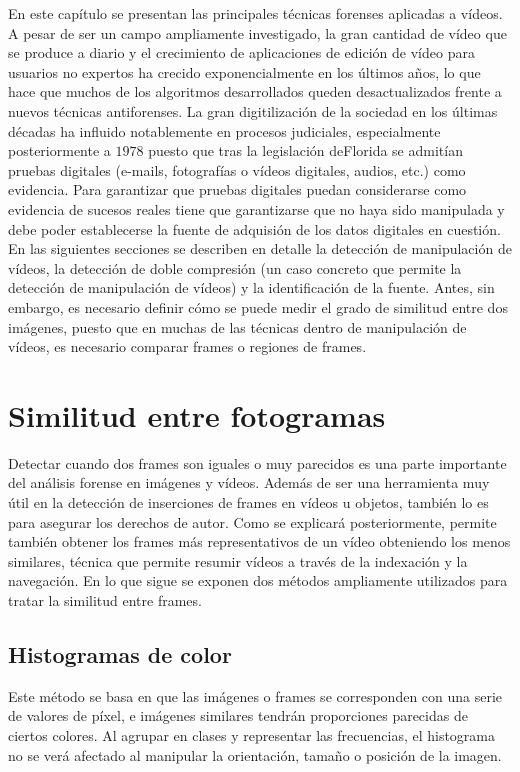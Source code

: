 En este capítulo se presentan las principales técnicas forenses aplicadas a vídeos. A pesar de ser un campo ampliamente investigado, la gran cantidad de vídeo que se produce a diario y el crecimiento de aplicaciones de edición de vídeo para usuarios no expertos ha crecido exponencialmente en los últimos a\~nos, lo que hace que muchos de los algoritmos desarrollados queden desactualizados frente a nuevos técnicas antiforenses. 
La gran digitilización de la sociedad en los últimas décadas ha influido notablemente en procesos judiciales, especialmente posteriormente a $1978$ puesto que tras la legislación deFlorida se admitían pruebas digitales (e-mails, fotografías o vídeos digitales, audios, etc.) como evidencia. Para garantizar que pruebas digitales puedan considerarse como evidencia de sucesos reales tiene que garantizarse que no haya sido manipulada y debe poder establecerse la fuente de adquisión de los datos digitales en cuestión. \\

En las siguientes secciones se describen en detalle la detección de manipulación de vídeos, la detección de doble compresión (un caso concreto que permite la detección de manipulación de vídeos) y la identificación de la fuente. Antes, sin embargo, es necesario definir cómo se puede medir el grado de similitud entre dos imágenes, puesto que en muchas de las técnicas dentro de manipulación de vídeos, es necesario comparar frames o regiones de frames. \\

\section{Similitud entre fotogramas}
Detectar cuando dos frames son iguales o muy parecidos es una parte importante del análisis forense en imágenes y vídeos. Además de ser una herramienta muy útil en la detección de inserciones de frames en vídeos u objetos, también lo es para asegurar los derechos de autor. Como se explicará posteriormente, permite también obtener los frames más representativos de un vídeo obteniendo los menos similares, técnica que permite resumir vídeos a través de la indexación y la navegación. En lo que sigue se exponen dos métodos ampliamente utilizados para tratar la similitud entre frames. \\

\subsection{Histogramas de color}
Este método se basa en que las imágenes o frames se corresponden con una serie de valores de píxel, e imágenes similares tendrán proporciones parecidas de ciertos colores\cite{jain:1996}. Al agrupar en clases y representar las frecuencias, el histograma no se verá afectado al manipular la orientación, tama\~no o posición de la imagen. \\

